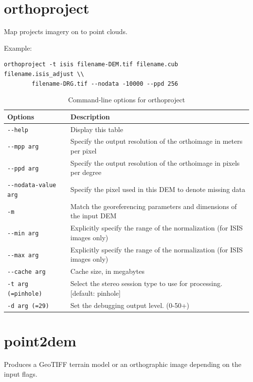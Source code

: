 \section{orthoproject}
\label{orthoproject}

Map projects imagery on to point clouds.

Example:
\begin{verbatim}
orthoproject -t isis filename-DEM.tif filename.cub filename.isis_adjust \\
        filename-DRG.tif --nodata -10000 --ppd 256
\end{verbatim}

\begin{longtable}{|l|p{10cm}|}
\caption{Command-line options for orthoproject}
\label{tbl:orthoproject}
\endfirsthead
\endhead
\endfoot
\endlastfoot
\hline
Options & Description \\ \hline \hline
\verb#--help# & Display this table \\ \hline
\verb#--mpp arg# & Specify the output resolution of the orthoimage in meters per pixel \\ \hline
\verb#--ppd arg# & Specify the output resolution of the orthoimage in pixels per degree \\ \hline
\verb#--nodata-value arg# & Specify the pixel used in this DEM to denote missing data \\ \hline
\verb#-m# & Match the georeferencing parameters and dimensions of the input DEM \\ \hline
\verb#--min arg# & Explicitly specify the range of the normalization (for ISIS images only) \\ \hline
\verb#--max arg# & Explicitly specify the range of the normalization (for ISIS images only) \\ \hline
\verb#--cache arg# & Cache size, in megabytes \\ \hline
\verb#-t arg (=pinhole)# & Select the stereo session type to use for processing. [default: pinhole] \\ \hline
\verb#-d arg (=29)# & Set the debugging output level. (0-50+) \\ \hline
\end{longtable}

\section{point2dem}
\label{point2dem}

Produces a GeoTIFF terrain model or an orthographic image depending on the input flags.

